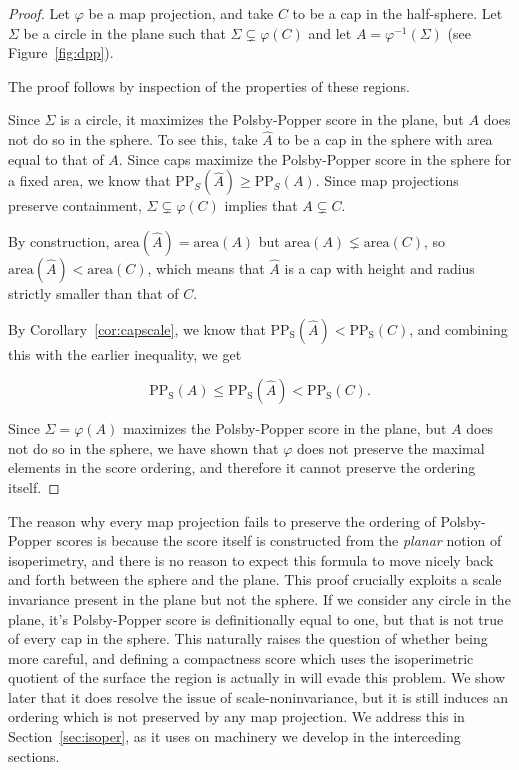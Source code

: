 \begin{proof}

	Let $\varphi$ be a map projection, and take $C$ to be a cap in the half-sphere. Let $\Sigma$ be a circle in the plane such that $\Sigma \subsetneq \varphi(C)$ and let $A=\varphi^{-1}(\Sigma)$ (see Figure~\ref{fig:dpp}).


	The proof follows by inspection of the properties of these regions.
	
	Since $\Sigma$ is a circle, it maximizes the Polsby-Popper score in the plane, but $A$ does not do so in the sphere.  To see this, take $\hat{A}$ to be a cap in the sphere with area equal to that of $A$.  Since caps maximize the Polsby-Popper score in the sphere for a fixed area, we know that $\mathrm{PP}_S(\hat{A})\geq \mathrm{PP}_S(A)$.  Since map projections preserve containment, $\Sigma\subsetneq \varphi(C)$ implies that $A\subsetneq C$.  
	
	By construction, $\mathrm{area}(\hat{A})=\mathrm{area}(A)$ but $\mathrm{area}(A) \lneq \mathrm{area}(C)$, so $\mathrm{area}(\hat{A})< \mathrm{area}(C)$, which means that $\hat{A}$ is a cap with height and radius strictly smaller than that of $C$.
	
	By   Corollary~\ref{cor:capscale}, we know that $\mathrm{PP_S}(\hat{A})< \mathrm{PP_S}(C)$, and combining this with the earlier inequality, we get
	
	$$\mathrm{PP_S}({A})\leq \mathrm{PP_S}(\hat{A})< \mathrm{PP_S}(C).$$
	
	Since $\Sigma = \varphi(A)$ maximizes the Polsby-Popper score in the plane, but $A$ does not do so in the sphere, we have shown that $\varphi$ does not preserve the maximal elements in the score ordering, and therefore it cannot preserve the ordering itself.
\end{proof}

The reason why every map projection fails to preserve the ordering of Polsby-Popper scores is because the score itself is constructed from the \textit{planar} notion of isoperimetry, and there is no reason to expect this formula to move nicely back and forth between the sphere and the plane.  This proof crucially exploits a scale invariance present in the plane but not the sphere.  If we consider any circle in the plane, it's Polsby-Popper score is definitionally equal to one, but that is not true of every cap in the sphere.  This naturally raises the question of whether being more careful, and defining a compactness score which uses the isoperimetric quotient of the surface the region is actually in will evade this problem.  We show later that it does resolve the issue of scale-noninvariance, but it is still induces an ordering which is not preserved by any map projection.  We address this in Section~\ref{sec:isoper}, as it uses on machinery we develop in the interceding sections.